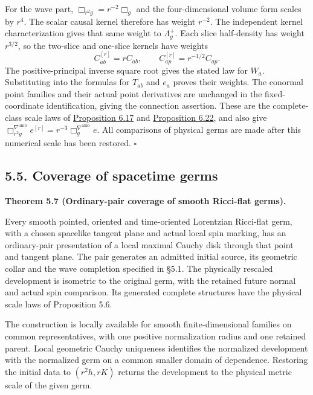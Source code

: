 \documentclass[
  english,
  11pt,
  reqno]{amsart}
\makeatletter
\newcommand{\paperdisplaynext}{%
  \let\paper@savedstartsection\@startsection
  \def\@startsection##1##2##3##4##5##6{%
    \let\@startsection\paper@savedstartsection
    \@tempskipa ##5\relax
    \ifdim\@tempskipa<\z@
      \def\paper@afterskip{.35\baselineskip}%
    \else
      \def\paper@afterskip{##5}%
    \fi
    \@startsection{##1}{##2}{##3}{##4}{\paper@afterskip}{##6}}}
\newcommand{\paperdisplaysection}{\paperdisplaynext\subsection}
\newcommand{\pandocstatementheading}[1]{%
  \par\if@nobreak\else
    \addpenalty{\@beginparpenalty}%
    \addvspace{.5\baselineskip plus .2\baselineskip minus .2\baselineskip}%
  \fi
  {\normalfont\bfseries #1\par}%
  \nobreak\@afterindenttrue\@afterheading
}
\let\paper@displaysection\paperdisplaysection
\renewcommand{\paperdisplaysection}[1]{%
  \let\paper@savedhangfrom\@hangfrom
  \long\def\@hangfrom##1##2{%
    \paper@savedhangfrom{##1}{\paper@headingparagraph##2}}%
  \paper@displaysection{#1}%
  \let\@hangfrom\paper@savedhangfrom}
\makeatother
\begin{document}
For the wave part, \(\Box_{r^2g}=r^{-2}\Box_g\) and the four-dimensional
volume form scales by \(r^4\). The scalar causal kernel therefore has
weight \(r^{-2}\). The independent kernel characterization gives that
same weight to \(\Lambda_g^+\). Each slice half-density has weight
\(r^{3/2}\), so the two-slice and one-slice kernels have weights \[
C_{ab}^{[r]}=rC_{ab},
\qquad
C_{ap}^{[r]}=r^{-1/2}C_{ap}.
\] The positive-principal inverse square root gives the stated law for
\(W_a\). Substituting into the formulas for \(T_{ab}\) and \(e_a\)
proves their weights. The conormal point families and their actual point
derivatives are unchanged in the fixed-coordinate identification, giving
the connection assertion. These are the complete-class scale laws of
\hyperref[prop:online-wave-carrier-families-scale]{Proposition 6.17} and
\hyperref[prop:online-point-connection-finite-families]{Proposition
6.22}, and also give \(\Box_{r^2g}^{\nabla^{\mathrm{amb}}}e^{[r]}
=r^{-3}\Box_g^{\nabla^{\mathrm{amb}}}e\). All comparisons of physical
germs are made after this numerical scale has been restored.
\hfill\(\square\)

\paperdisplaysection{5.5. Coverage of spacetime
germs}\label{coverage-of-spacetime-germs}\label{sec:submission-spacetime-coverage}

\pandocstatementheading{\leavevmode{}\label{thm:submission-vacuum-germ-coverage}Theorem 5.7 (Ordinary-pair coverage of smooth Ricci-flat germs).}

Every smooth pointed, oriented and time-oriented Lorentzian Ricci-flat
germ, with a chosen spacelike tangent plane and actual local spin
marking, has an ordinary-pair presentation of a local maximal Cauchy
disk through that point and tangent plane. The pair generates an
admitted initial source, its geometric collar and the wave completion
specified in §5.1. The physically rescaled development is isometric to
the original germ, with the retained future normal and actual spin
comparison. Its generated complete structures have the physical scale
laws of Proposition 5.6.

The construction is locally available for smooth finite-dimensional
families on common representatives, with one positive normalization
radius and one retained parent. Local geometric Cauchy uniqueness
identifies the normalized development with the normalized germ on a
common smaller domain of dependence. Restoring the initial data to
\((r^2h,rK)\) returns the development to the physical metric scale of
the given germ.
\end{document}
